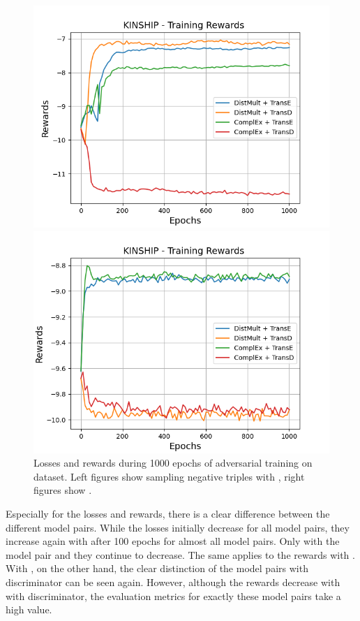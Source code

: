 \begin{figure}[H]
    \begin{minipage}{.5\textwidth}
      \centering
      \includegraphics[width=0.9\linewidth]{figures/results/gan_train/not_pretrained/uncertainty/max/entropy/kinship/1k_epochs/uncertainty_kinship_rew.png}
    \end{minipage}%
    \begin{minipage}{.5\textwidth}
      \centering
      \includegraphics[width=0.9\linewidth]{figures/results/gan_train/not_pretrained/uncertainty/max_distribution/entropy/kinship/1k_epochs/uncertainty_kinship_rew.png}
    \end{minipage}%
    \caption{Losses and rewards during 1000 epochs of adversarial training on \kinship dataset. 
    Left figures show sampling negative triples with \usmax, right figures show \ussoftmax.}
    \label{fig:advtrain_kinship_usmax_ussoftmax_losses_rewards}
\end{figure}
Especially for the losses and rewards, there is a clear difference between the different model pairs.
While the losses initially decrease for all model pairs, they increase again with \usmax after 100 epochs for almost all model pairs.
Only with the model pair \complex and \distmult they continue to decrease.
The same applies to the rewards with \usmax.
With \ussoftmax, on the other hand, the clear distinction of the model pairs with \transd discriminator can be seen again. 
However, although the rewards decrease with \ussoftmax with \transd discriminator, the evaluation metrics for exactly these model pairs take a high value.